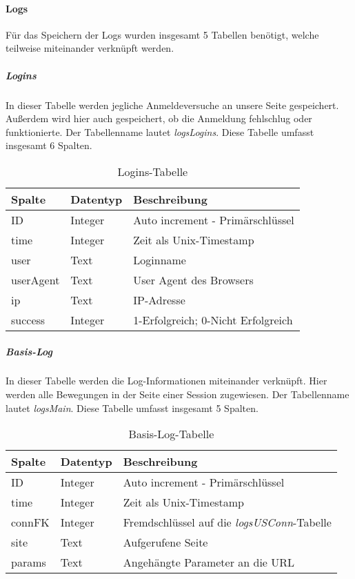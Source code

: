 \paragraph{Logs\\}
Für das Speichern der Logs wurden insgesamt 5 Tabellen benötigt, welche teilweise miteinander verknüpft werden.

\subparagraph{Logins\\}
In dieser Tabelle werden jegliche Anmeldeversuche an unsere Seite gespeichert. Außerdem wird hier auch gespeichert, ob die Anmeldung fehlschlug oder funktionierte. Der Tabellenname lautet \textit{logsLogins}. Diese Tabelle umfasst insgesamt 6 Spalten.

\begin{table}[H]
\centering
\begin{tabular}{p{2.5 cm}p{2.5 cm}p{10 cm}}
   \toprule
   \textbf{Spalte} & \textbf{Datentyp} & \textbf{Beschreibung} \\
   \midrule
          ID & Integer & Auto increment - Primärschlüssel  \\
          \hline
          time & Integer & Zeit als Unix-Timestamp   \\
          \hline
	      user & Text & Loginname   \\
	      \hline
          userAgent & Text & User Agent des Browsers   \\
          \hline
          ip & Text & IP-Adresse  \\
          \hline
          success & Integer & 1-Erfolgreich; 0-Nicht Erfolgreich  \\
   \bottomrule
\end{tabular}
\caption{Logins-Tabelle}
\end{table}

\subparagraph{Basis-Log\\}
In dieser Tabelle werden die Log-Informationen miteinander verknüpft. Hier werden alle Bewegungen in der Seite einer Session zugewiesen. Der Tabellenname lautet \textit{logsMain}. Diese Tabelle umfasst insgesamt 5 Spalten.

\begin{table}[H]
\centering
\begin{tabular}{p{2.5 cm}p{2.5 cm}p{10 cm}}
   \toprule
   \textbf{Spalte} & \textbf{Datentyp} & \textbf{Beschreibung} \\
   \midrule
          ID & Integer & Auto increment - Primärschlüssel  \\
          \hline
          time & Integer & Zeit als Unix-Timestamp   \\
          \hline
	      connFK & Integer & Fremdschlüssel auf die \textit{logsUSConn}-Tabelle   \\
	      \hline
          site & Text & Aufgerufene Seite   \\
          \hline
          params & Text & Angehängte Parameter an die URL  \\
   \bottomrule
\end{tabular}
\caption{Basis-Log-Tabelle}
\end{table}

